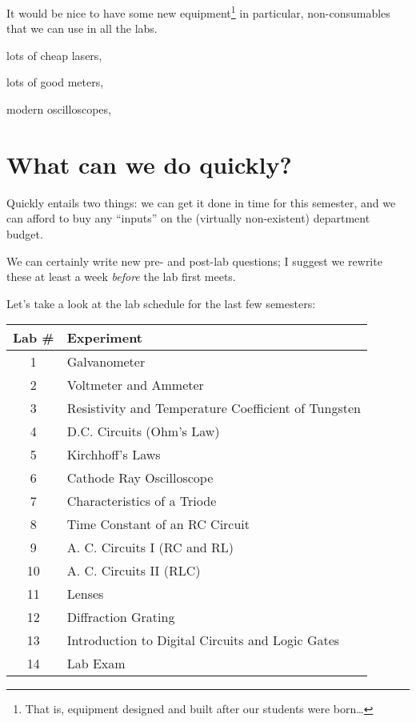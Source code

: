 \documentclass[12pt]{article}
\begin{document}
It would be nice to have some new equipment\footnote{That is,
  equipment designed and built after our students were born\ldots} in
particular, non-consumables that we can use in all the labs.
\begin{inparaitem}
  \item lots of cheap lasers,
  \item lots of good meters,
  \item modern oscilloscopes,
\end{inparaitem}

\section{What can we do quickly?}
\label{sec:quickly}

Quickly entails two things: we can get it done in time for this
semester, and we can afford to buy any ``inputs'' on the (virtually
non-existent) department budget.

We can certainly write new pre- and post-lab questions; I suggest we
rewrite these at least a week \textit{before} the lab first meets.

Let's take a look at the lab schedule for the last few semesters:
\begin{center}
\begin{tabular}{|c|l|}
\hline
\textbf{Lab \#} & \textbf{Experiment} \\ \hline
1 & Galvanometer \\ \hline
2 & Voltmeter and Ammeter \\ \hline
3 & Resistivity and Temperature Coefficient of Tungsten \\ \hline
4 & D.C. Circuits (Ohm's Law) \\ \hline
5 & Kirchhoff's Laws \\ \hline
6 & Cathode Ray Oscilloscope \\ \hline
7 & Characteristics of a Triode \\ \hline
8 & Time Constant of an RC Circuit \\ \hline
9 & A. C. Circuits I (RC and RL) \\ \hline
10 & A. C. Circuits II (RLC) \\ \hline
11 & Lenses \\ \hline
12 & Diffraction Grating \\ \hline
13 & Introduction to Digital Circuits and Logic Gates \\ \hline
14 & Lab Exam \\ \hline
\end{tabular}
\end{center}
\end{document}
